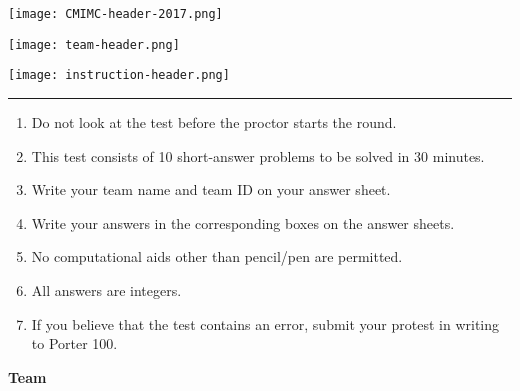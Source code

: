 \documentclass[10pt]{article}
\begin{document}
\thispagestyle{empty}
\begin{center}

\vspace*{90pt}

\texttt{[image: CMIMC-header-2017.png]}

\texttt{[image: team-header.png]}

\vspace{1.6in}

\texttt{[image: instruction-header.png]}
\noindent\rule{17.7cm}{2pt}
\end{center}

\vspace{10pt}

\begin{enumerate}
	\large
	\item Do not look at the test before the proctor starts the round.
	\item This test consists of 10 short-answer problems to be solved in 30
		minutes.
	\item Write your team name and team ID on your answer sheet.
	\item Write your answers in the corresponding boxes on the answer
		sheets.
	\item No computational aids other than pencil/pen are permitted.
	\item All answers are integers.
	\item If you believe that the test contains an error, submit your
		protest in writing to Porter 100.
\end{enumerate}

\newpage

\begin{center}
\Large\textbf{Team}\normalsize
\end{center}
\end{document}
